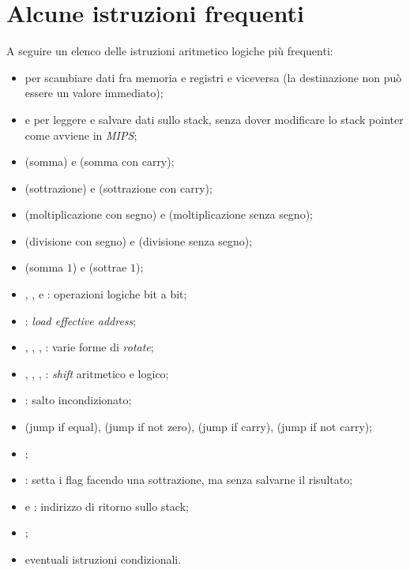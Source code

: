 \documentclass[class=book, crop=false, oneside]{standalone}
\begin{document}
\section{Alcune istruzioni frequenti}
A seguire un elenco delle istruzioni aritmetico logiche più frequenti:
\begin{itemize}[noitemsep]
	\item {} per scambiare dati fra memoria e registri e viceversa (la destinazione non può essere un valore immediato);
	\item {} e  per leggere e salvare dati sullo stack, senza dover modificare lo stack pointer come avviene in \emph{MIPS};
	\item {} (somma) e  (somma con carry);
	\item {} (sottrazione) e  (sottrazione con carry);
	\item {} (moltiplicazione con segno) e  (moltiplicazione senza segno);
	\item {} (divisione con segno) e  (divisione senza segno);
	\item {} (somma \(1\)) e  (sottrae \(1\));
	\item {}, ,  e : operazioni logiche bit a bit;
	\item {}: \emph{load effective address};
	\item {}, , , : varie forme di \emph{rotate};
	\item {}, , , : \emph{shift} aritmetico e logico;
	\item {}: salto incondizionato;
	\item {} (jump if equal),  (jump if not zero),  (jump if carry),  (jump if not carry);
	\item {};
	\item {}: setta i flag facendo una sottrazione, ma senza salvarne il risultato;
	\item {} e : indirizzo di ritorno sullo stack;
	\item {};
	\item eventuali istruzioni condizionali.
\end{itemize}
\end{document}
